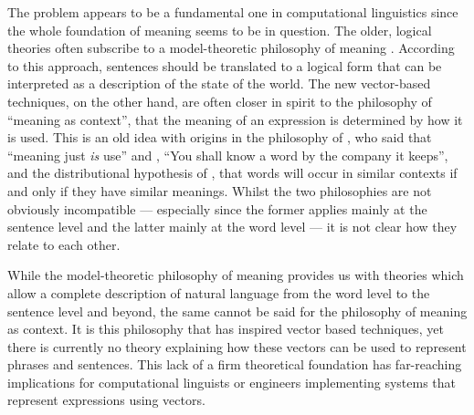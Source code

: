 The problem appears to be a fundamental one in computational linguistics since the whole foundation of meaning seems to be in question. The older, logical theories often subscribe to a model-theoretic  philosophy of meaning \citep{Kamp:93, Blackburn:05}. According to this approach, sentences should be translated to a logical form that can be interpreted as a description of the state of the world. The new vector-based techniques, on the other hand, are often closer in spirit to the philosophy of ``meaning as context'', that the meaning of an expression is determined by how it is used. This is an old idea with origins in the philosophy of \cite{Wittgenstein:53}, who said that ``meaning just \emph{is} use''  and \cite{Firth:57}, ``You shall know a word by the company it keeps'', and the distributional hypothesis of \cite{Harris:68}, that words will occur in similar contexts if and only if they have similar meanings. Whilst the two philosophies are not obviously incompatible --- especially since the former applies mainly at the sentence level and the latter mainly at the word level --- it is not clear how they relate to each other.

While the model-theoretic philosophy of meaning provides us with theories which allow a complete description of natural language from the word level to the sentence level and beyond, the same cannot be said for the philosophy of meaning as context. It is this philosophy that has inspired vector based techniques, yet there is currently no theory explaining how these vectors can be used to represent phrases and sentences. This lack of a firm theoretical foundation has far-reaching implications for computational linguists or engineers implementing systems that represent expressions using vectors.

